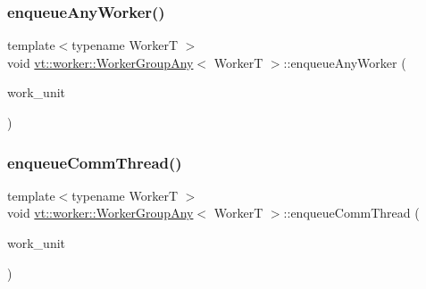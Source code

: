 \subsubsection{\texorpdfstring{enqueue\+Any\+Worker()}{enqueueAnyWorker()}}
{\footnotesize\ttfamily template$<$typename WorkerT $>$ \\
void \hyperlink{structvt_1_1worker_1_1_worker_group_any}{vt\+::worker\+::\+Worker\+Group\+Any}$<$ WorkerT $>$\+::enqueue\+Any\+Worker (\begin{DoxyParamCaption}\item[{\hyperlink{namespacevt_1_1worker_a59d2fcdafa81fc0af7f921a258e42202}{Work\+Unit\+Type} const \&}]{work\+\_\+unit }\end{DoxyParamCaption})}

\mbox{\label{structvt_1_1worker_1_1_worker_group_any_a876ea312a8cefa1caa8bbf86caff208d}} 
\subsubsection{\texorpdfstring{enqueue\+Comm\+Thread()}{enqueueCommThread()}}
{\footnotesize\ttfamily template$<$typename WorkerT $>$ \\
void \hyperlink{structvt_1_1worker_1_1_worker_group_any}{vt\+::worker\+::\+Worker\+Group\+Any}$<$ WorkerT $>$\+::enqueue\+Comm\+Thread (\begin{DoxyParamCaption}\item[{\hyperlink{namespacevt_1_1worker_a59d2fcdafa81fc0af7f921a258e42202}{Work\+Unit\+Type} const \&}]{work\+\_\+unit }\end{DoxyParamCaption})}

\mbox{\label{structvt_1_1worker_1_1_worker_group_any_a7f800682c86f876c626d3ee1b9735680}} 
